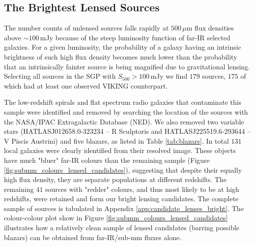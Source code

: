 \subsection{The Brightest Lensed Sources}
\label{sec:brightest_lenses}

The number counts of unlensed sources falls rapidly at $500\,\mu$m flux densities above $\sim 100\,$mJy because of the steep luminosity function of far-IR selected galaxies. For a given luminosity, the probability of a galaxy having an intrinsic brightness of such high flux density becomes much lower than the probability that an intrinsically fainter source is being magnified due to gravitational lensing. Selecting all sources in the SGP with $S_{500} > 100\,$mJy we find $179$ sources, $175$ of which had at least one observed VIKING counterpart. 

The low-redshift spirals and flat spectrum radio galaxies that contaminate this sample were identified and removed by searching the location of the sources with the NASA/IPAC Extragalactic Database (NED). We also removed two variable stars (HATLASJ012658.0-323234 -- R Sculptoris and HATLASJ225519.6-293644 -- V Piscis Austrini) and five blazars, as listed in Table \ref{tab:blazars}. In total $131$ local galaxies were clearly identified from their resolved image. These objects have much "bluer" far-IR colours than the remaining sample (Figure \ref{fig:submm_colours_lensed_candidates}), suggesting that despite their equally high flux density, they are separate populations at different redshifts. The remaining $41$ sources with "redder" colours, and thus most likely to be at high redshifts, were retained and form our bright lensing candidates. The complete sample of sources is tabulated in Appendix \ref{app:candidate_lenses_bright}. The colour-colour plot show in Figure \ref{fig:submm_colours_lensed_candidates} illustrates how a relatively clean sample of lensed candidates (barring possible blazars) can be obtained from far-IR/sub-mm fluxes alone.

